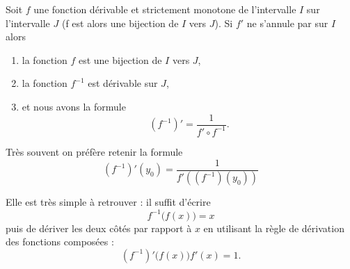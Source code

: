 \begin{proposition}      \label{PROPooSGTBooFxUuXK}
    Soit \(f \) une fonction dérivable et strictement monotone de l'intervalle \( I\) sur l'intervalle \( J\)  (f est alors une bijection de $I$ vers $J$). Si \( f'\)  ne s'annule par sur \( I\) alors
    \begin{enumerate}
        \item
            la fonction \( f\) est une bijection de \( I\) vers \( J\),
        \item
            la fonction \( f^{-1}\) est dérivable sur \( J\),
        \item
            et nous avons la formule
            \begin{equation}        \label{EQooELIHooDxUFxH}
                (f^{-1})'=\frac{1}{ f'\circ f^{-1} }.
            \end{equation}
    \end{enumerate}
\end{proposition}

\begin{normaltext}
 Très souvent on préfère retenir la formule
    \begin{equation}\label{EqWWAooBRFNsv}
      (f^{-1})'(y_0) = \frac{1}{f'\left((f^{-1})(y_0)\right)}
    \end{equation}

    Elle est très simple à retrouver : il suffit d'écrire
    \begin{equation}
        f^{-1}\big( f(x) \big)=x
    \end{equation}
    puis de dériver les deux côtés par rapport à \( x\) en utilisant la règle de dérivation des fonctions composées :
    \begin{equation}
        (f^{-1})'\big( f(x) \big)f'(x)=1.
    \end{equation}
\end{normaltext}

